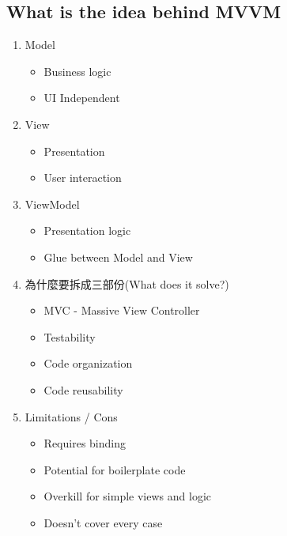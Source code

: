 \documentclass[a4paper,12pt]{article}
\begin{document}
\subsection{What is the idea behind MVVM}
\label{sec:org0fa99d4}
\begin{enumerate}
\item Model
\label{sec:org242105f}
\begin{itemize}
\item Business logic\\
\item UI Independent\\
\end{itemize}
\item View
\label{sec:org1c7efd4}
\begin{itemize}
\item Presentation\\
\item User interaction\\
\end{itemize}
\item ViewModel
\label{sec:orga653343}
\begin{itemize}
\item Presentation logic\\
\item Glue between Model and View\\
\end{itemize}
\item 為什麼要拆成三部份(What does it solve?)
\label{sec:orgef4b9a5}
\begin{itemize}
\item MVC - Massive View Controller\\
\item Testability\\
\item Code organization\\
\item Code reusability\\
\end{itemize}
\item Limitations / Cons
\label{sec:org585ad1b}
\begin{itemize}
\item Requires binding\\
\item Potential for boilerplate code\\
\item Overkill for simple views and logic\\
\item Doesn't cover every case\\
\end{itemize}
\end{enumerate}
\end{document}
